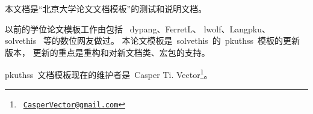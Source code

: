 
本文档是“北京大学论文文档模板”的测试和说明文档。

以前的学位论文模板工作由包括~%
dypang\supercite{dypang}、FerretL\supercite{FerretL}、
lwolf\supercite{lwolf}、Langpku\supercite{Langpku}、
solvethis\supercite{solvethis}~%
等的数位网友做过。
本论文模板是~solvethis~的~pkuthss~模板的更新版本，
更新的重点是重构和对新文档类、宏包的支持。

pkuthss~文档模板现在的维护者是~Casper Ti. Vector\footnote%
{\ \href{CasperVector@gmail.com}{\texttt{CasperVector@gmail.com}}}。

